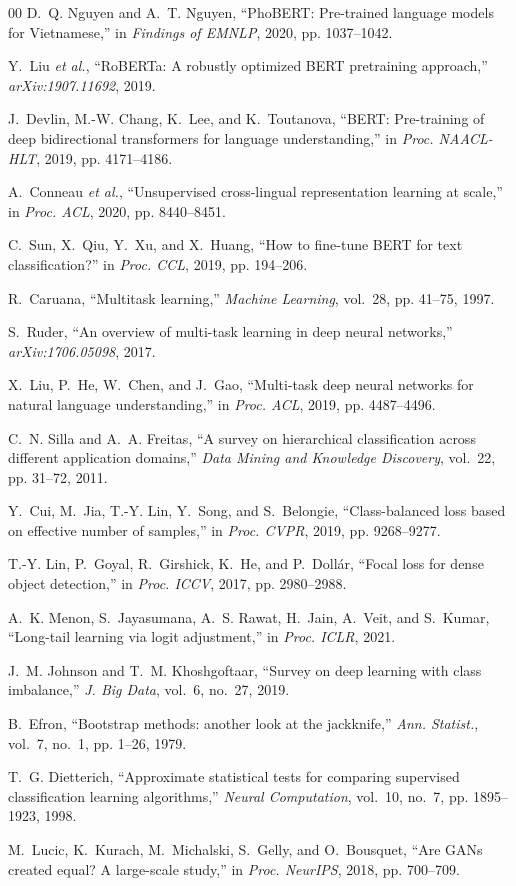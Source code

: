 \documentclass[12pt,a4paper]{article}
\newcommand{\phobert}{PhoBERT}
\begin{document}
\begin{thebibliography}{00}
D.~Q. Nguyen and A.~T. Nguyen, ``\phobert: Pre-trained language models for Vietnamese,'' in \emph{Findings of EMNLP}, 2020, pp. 1037--1042.

Y.~Liu \emph{et al.}, ``RoBERTa: A robustly optimized BERT pretraining approach,'' \emph{arXiv:1907.11692}, 2019.

J.~Devlin, M.-W. Chang, K.~Lee, and K.~Toutanova, ``BERT: Pre-training of deep bidirectional transformers for language understanding,'' in \emph{Proc. NAACL-HLT}, 2019, pp. 4171--4186.

A.~Conneau \emph{et al.}, ``Unsupervised cross-lingual representation learning at scale,'' in \emph{Proc. ACL}, 2020, pp. 8440--8451.

C.~Sun, X.~Qiu, Y.~Xu, and X.~Huang, ``How to fine-tune BERT for text classification?'' in \emph{Proc. CCL}, 2019, pp. 194--206.

R.~Caruana, ``Multitask learning,'' \emph{Machine Learning}, vol.~28, pp. 41--75, 1997.

S.~Ruder, ``An overview of multi-task learning in deep neural networks,'' \emph{arXiv:1706.05098}, 2017.

X.~Liu, P.~He, W.~Chen, and J.~Gao, ``Multi-task deep neural networks for natural language understanding,'' in \emph{Proc. ACL}, 2019, pp. 4487--4496.

C.~N. Silla and A.~A. Freitas, ``A survey on hierarchical classification across different application domains,'' \emph{Data Mining and Knowledge Discovery}, vol.~22, pp. 31--72, 2011.

Y.~Cui, M.~Jia, T.-Y. Lin, Y.~Song, and S.~Belongie, ``Class-balanced loss based on effective number of samples,'' in \emph{Proc. CVPR}, 2019, pp. 9268--9277.

T.-Y. Lin, P.~Goyal, R.~Girshick, K.~He, and P.~Doll\'ar, ``Focal loss for dense object detection,'' in \emph{Proc. ICCV}, 2017, pp. 2980--2988.

A.~K. Menon, S.~Jayasumana, A.~S. Rawat, H.~Jain, A.~Veit, and S.~Kumar, ``Long-tail learning via logit adjustment,'' in \emph{Proc. ICLR}, 2021.

J.~M. Johnson and T.~M. Khoshgoftaar, ``Survey on deep learning with class imbalance,'' \emph{J. Big Data}, vol.~6, no.~27, 2019.

B.~Efron, ``Bootstrap methods: another look at the jackknife,'' \emph{Ann. Statist.}, vol.~7, no.~1, pp. 1--26, 1979.

T.~G. Dietterich, ``Approximate statistical tests for comparing supervised classification learning algorithms,'' \emph{Neural Computation}, vol.~10, no.~7, pp. 1895--1923, 1998.

M.~Lucic, K.~Kurach, M.~Michalski, S.~Gelly, and O.~Bousquet, ``Are GANs created equal? A large-scale study,'' in \emph{Proc. NeurIPS}, 2018, pp. 700--709.

\end{thebibliography}
\end{document}
